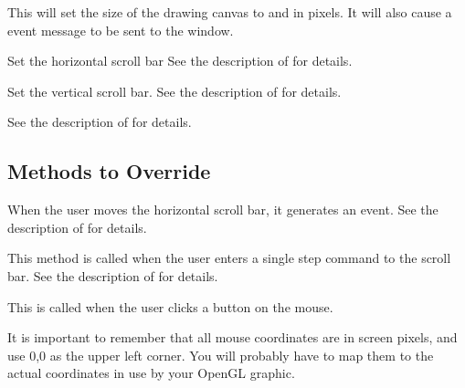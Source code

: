 This will set the size of the drawing canvas to 
and  in pixels. It will also cause a 
event message to be sent to the window.


Set the horizontal scroll bar
See the description of  for details.


Set the vertical scroll bar. 
See the description of  for details.


See the description of  for details.

\subsection* {Methods to Override} %


When the user moves the horizontal scroll bar, it generates an
 event. 
See the description of  for details.


This method is called when the user enters a single step command
to the scroll bar. 
See the description of  for details.


This is called when the user clicks a button on the mouse.

It is important to remember that all mouse coordinates are
in screen pixels, and use 0,0 as the upper left corner.
You will probably have to map them to the actual coordinates
in use by your OpenGL graphic.

